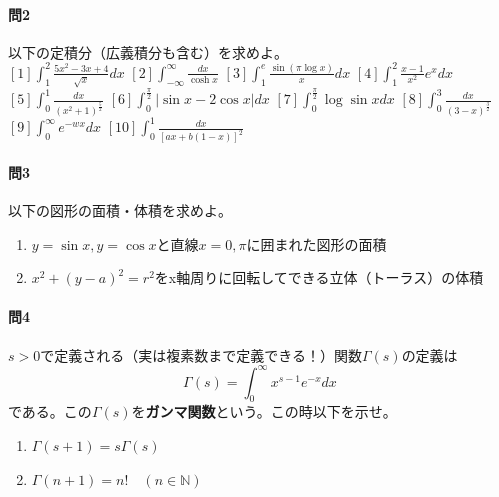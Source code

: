 \documentclass[a4j,dvipdfmx]{jsarticle}
\begin{document}
            \paragraph{問2}以下の定積分（広義積分も含む）を求めよ。\\
                $\displaystyle [1]\int_1^2\frac{5x^2-3x+4}{\sqrt{x}}dx$\hspace{3mm}
                $\displaystyle [2]\int_{-\infty}^{\infty}\frac{dx}{\cosh x}$\hspace{3mm}
                $\displaystyle [3]\int_1^e \frac{\sin(\pi\log x)}{x}dx$\hspace{3mm}
                $\displaystyle [4]\int_1^2 \frac{x-1}{x^2}e^xdx$\hspace{3mm}
                $\displaystyle [5]\int_0^1 \frac{dx}{(x^2+1)^{\frac{5}{2}}}$\hspace{3mm}
                $\displaystyle [6]\int_0^{\frac{\pi}{2}}|\sin x-2\cos x|dx$\hspace{3mm}
                $\displaystyle [7]\int_0^{\frac{\pi}{2}}\log\sin xdx$\hspace{3mm}
                $\displaystyle [8]\int_0^3\frac{dx}{(3-x)^{\frac{3}{2}}}$\hspace{3mm}
                $\displaystyle [9]\int_0^\infty e^{-wx}dx $\hspace{3mm}
                $\displaystyle [10]\int_0^1\frac{dx}{\left[ax+b(1-x)\right]^2}$
            
            \paragraph{問3}以下の図形の面積・体積を求めよ。
                \begin{enumerate}\setcounter{enumi}{0}\renewcommand{\labelenumi}{(\arabic{enumi})}
                    \item $y=\sin x,y=\cos x$と直線$x=0,\pi$に囲まれた図形の面積
                    \item $x^2+(y-a)^2 = r^2$をx軸周りに回転してできる立体（トーラス）の体積
                \end{enumerate}
            
            \paragraph{問4}$s>0$で定義される（実は複素数まで定義できる！）関数$\Gamma(s)$の定義は
                \begin{equation}
                    \Gamma(s) = \int_{0}^{\infty}x^{s-1}e^{-x}dx \label{eq:ガンマ関数}
                \end{equation}
                である。この$\Gamma(s)$を\textbf{ガンマ関数}という。この時以下を示せ。
                \begin{enumerate}\setcounter{enumi}{0}\renewcommand{\labelenumi}{(\arabic{enumi})}
                    \item $\Gamma(s+1)=s\Gamma(s)$
                    \item $\Gamma(n+1)=n!\quad (n\in \mathbb{N})$
                \end{enumerate}
\end{document}
